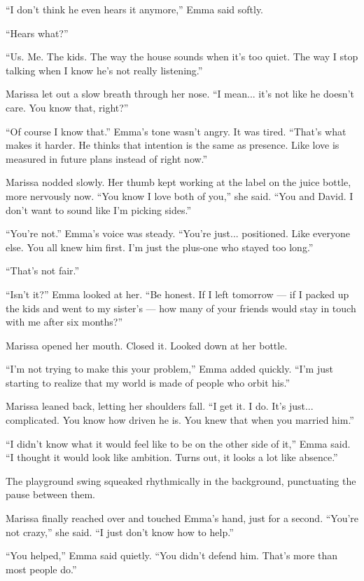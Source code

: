 ``I don’t think he even hears it anymore,'' Emma said softly.

``Hears what?''

``Us. Me. The kids. The way the house sounds when it’s too quiet. The way I stop talking when I know 
he’s not really listening.''

Marissa let out a slow breath through her nose. ``I mean... it’s not like he doesn’t care. You know that, 
right?''

``Of course I know that.'' Emma’s tone wasn’t angry. It was tired. ``That’s what makes it harder. He 
thinks that intention is the same as presence. Like love is measured in future plans instead of right 
now.''

Marissa nodded slowly. Her thumb kept working at the label on the juice bottle, more nervously now. 
``You know I love both of you,'' she said. ``You and David. I don’t want to sound like I’m picking 
sides.''

``You’re not.'' Emma’s voice was steady. ``You’re just... positioned. Like everyone else. You all knew 
him first. I’m just the plus-one who stayed too long.''

``That’s not fair.''

``Isn’t it?'' Emma looked at her. ``Be honest. If I left tomorrow — if I packed up the kids and went to 
my sister’s — how many of your friends would stay in touch with me after six months?''

Marissa opened her mouth. Closed it. Looked down at her bottle.

``I’m not trying to make this your problem,'' Emma added quickly. ``I’m just starting to realize that my 
world is made of people who orbit his.''

Marissa leaned back, letting her shoulders fall. ``I get it. I do. It’s just... complicated. You know how 
driven he is. You knew that when you married him.''

``I didn’t know what it would feel like to be on the other side of it,'' Emma said. ``I thought it would 
look like ambition. Turns out, it looks a lot like absence.''

The playground swing squeaked rhythmically in the background, punctuating the pause between them.

Marissa finally reached over and touched Emma’s hand, just for a second. ``You’re not crazy,'' she said. 
``I just don’t know how to help.''

``You helped,'' Emma said quietly. ``You didn’t defend him. That’s more than most people do.''

